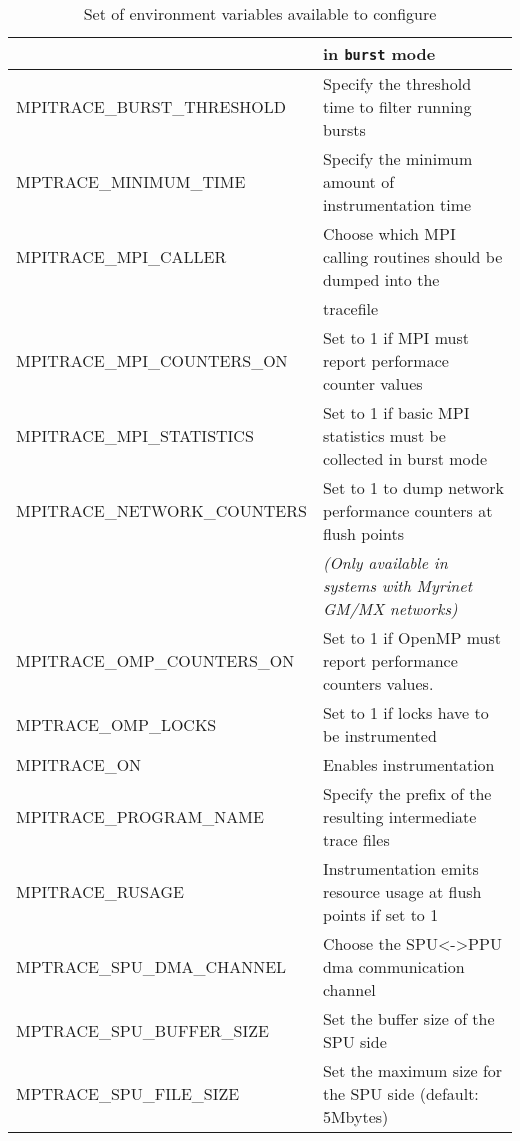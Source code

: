 \begin{table}[!ht]
{\begin{tabular}{| l | l |}
                          & in {\tt burst} mode\\
  \hline
  MPITRACE\_BURST\_THRESHOLD & Specify the threshold time to filter running bursts\\
  \hline
  MPTRACE\_MINIMUM\_TIME & Specify the minimum amount of instrumentation time\\
  \hline
  MPITRACE\_MPI\_CALLER & Choose which MPI calling routines should be dumped into the\\
                        & tracefile\\
  \hline
  MPITRACE\_MPI\_COUNTERS\_ON & Set to 1 if MPI must report performace counter values\\
  \hline 
  MPITRACE\_MPI\_STATISTICS & Set to 1 if basic MPI statistics must be collected in burst mode\\
  \hline
  MPITRACE\_NETWORK\_COUNTERS & Set to 1 to dump network performance counters at flush points\\
                              & {\em (Only available in systems with Myrinet GM/MX networks)}\\
  \hline
  MPITRACE\_OMP\_COUNTERS\_ON & Set to 1 if OpenMP must report performance counters values. \\
  \hline
  MPTRACE\_OMP\_LOCKS & Set to 1 if locks have to be instrumented\\
  \hline 
  MPITRACE\_ON & Enables instrumentation\\
  \hline
  MPITRACE\_PROGRAM\_NAME & Specify the prefix of the resulting intermediate trace files\\ 
  \hline
  MPITRACE\_RUSAGE & Instrumentation emits resource usage at flush points if set to 1\\
  \hline
  MPTRACE\_SPU\_DMA\_CHANNEL & Choose the SPU<->PPU dma communication channel\\
  \hline
  MPTRACE\_SPU\_BUFFER\_SIZE & Set the buffer size of the SPU side\\
  \hline 
  MPTRACE\_SPU\_FILE\_SIZE & Set the maximum size for the SPU side (default: 5Mbytes)\\
  \hline
\end{tabular}
}
\caption{Set of environment variables available to configure \TRACE}
\label{tab:EnvironmentVariables}
\end{table}

